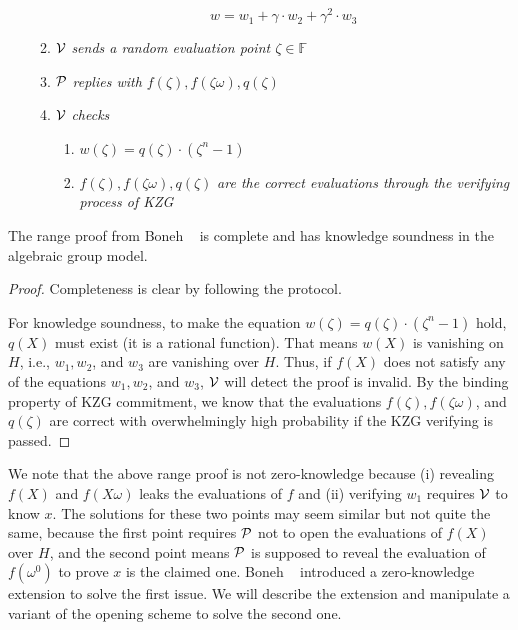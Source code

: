 \begin{enumerate}
\begin{enumerate}
        \[ w=w_1+\gamma\cdot{w_2}+\gamma^2\cdot{w_3} \]
        \item $\mathcal{V}$ \textit{sends a random evaluation point $\zeta\in\mathbb{F}$}
        \item $\mathcal{P}$ \textit{replies with $f(\zeta),f(\zeta\omega),q(\zeta)$}
        \item $\mathcal{V}$ \textit{checks}
        \begin{enumerate}
            \item $w(\zeta)=q(\zeta)\cdot(\zeta^n-1)$
            \item $f(\zeta),f(\zeta\omega),q(\zeta)$ \textit{are the correct evaluations through the verifying process of KZG}
        \end{enumerate}
    \end{enumerate}
\end{enumerate}

\begin{lemma}
\label{lemma:range}
The range proof from Boneh \etal~\cite{rangeproof} is complete and has knowledge soundness in the algebraic group model.
\end{lemma}

\begin{proof}
Completeness is clear by following the protocol.

For knowledge soundness, to make the equation $w(\zeta)=q(\zeta)\cdot(\zeta^n-1)$ hold, $q(X)$ must exist (it is a rational function). That means $w(X)$ is vanishing on $H$, i.e., $w_1,w_2$, and $w_3$ are vanishing over $H$. Thus, if $f(X)$ does not satisfy any of the equations $w_1,w_2$, and $w_3$, $\mathcal{V}$ will detect the proof is invalid. By the binding property of KZG commitment, we know that the evaluations $f(\zeta),f(\zeta\omega)$, and $q(\zeta)$ are correct with overwhelmingly high probability if the KZG verifying is passed.
\end{proof}
We note that the above range proof is not zero-knowledge because (i) revealing $f(X)$ and $f(X\omega)$ leaks the evaluations of $f$ and (ii) verifying $w_1$ requires $\mathcal{V}$ to know $x$. The solutions for these two points may seem similar but not quite the same, because the first point requires $\mathcal{P}$ not to open the evaluations of $f(X)$ over $H$, and the second point means $\mathcal{P}$ is supposed to reveal the evaluation of $f(\omega^0)$ to prove $x$ is the claimed one. Boneh \etal~\cite{rangeproof} introduced a zero-knowledge extension to solve the first issue. We will describe the extension and manipulate a variant of the opening scheme to solve the second one.

